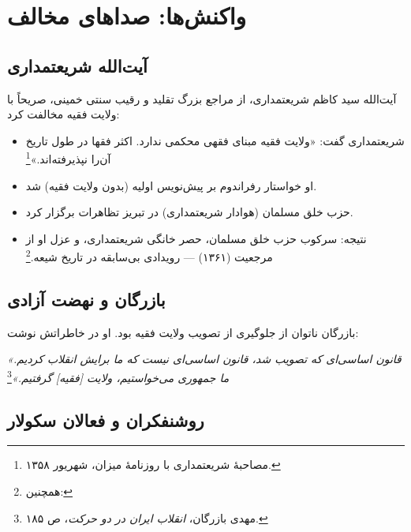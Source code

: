 \section{واکنش‌ها: صداهای مخالف}

\subsection{آیت‌الله شریعتمداری}

آیت‌الله سید کاظم شریعتمداری، از مراجع بزرگ تقلید و رقیب سنتی خمینی، صریحاً با ولایت فقیه مخالفت کرد:

\begin{noteBox}
\begin{itemize}[label=\textcolor{cGold}{$\blacktriangleright$}, rightmargin=2em]
    \item شریعتمداری گفت: «ولایت فقیه مبنای فقهی محکمی ندارد. اکثر فقها در طول تاریخ آن‌را نپذیرفته‌اند.»\footnote{مصاحبهٔ شریعتمداری با روزنامهٔ میزان، شهریور ۱۳۵۸.}
    \item او خواستار رفراندوم بر پیش‌نویس اولیه (بدون ولایت فقیه) شد.
    \item حزب خلق مسلمان (هوادار شریعتمداری) در تبریز تظاهرات برگزار کرد.
    \item نتیجه: سرکوب حزب خلق مسلمان، حصر خانگی شریعتمداری، و عزل او از مرجعیت (۱۳۶۱) — رویدادی بی‌سابقه در تاریخ شیعه.\footnote{ همچنین: }
\end{itemize}
\end{noteBox}

\subsection{بازرگان و نهضت آزادی}

بازرگان ناتوان از جلوگیری از تصویب ولایت فقیه بود. او در خاطراتش نوشت:

\begin{warningBox}
\textit{«قانون اساسی‌ای که تصویب شد، قانون اساسی‌ای نیست که ما برایش انقلاب کردیم. ما جمهوری می‌خواستیم، ولایت [فقیه] گرفتیم.»}\footnote{مهدی بازرگان، \textit{انقلاب ایران در دو حرکت}، ص ۱۸۵.}
\end{warningBox}

\subsection{روشنفکران و فعالان سکولار}

